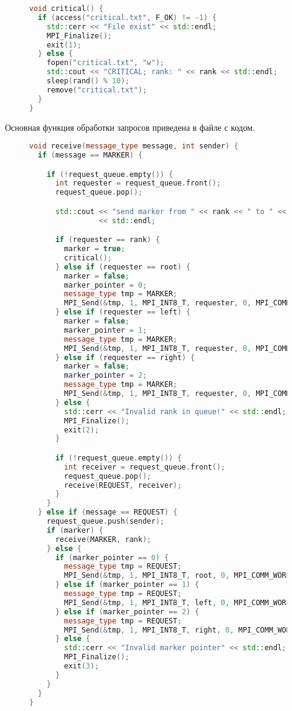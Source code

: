 \documentclass[12pt, oneside, a4paper]{article}
\begin{document}
\begin{figure}[h]
\begin{lstlisting}[language=C++]
void critical() {
  if (access("critical.txt", F_OK) != -1) {
    std::cerr << "File exist" << std::endl;
    MPI_Finalize();
    exit(1);
  } else {
    fopen("critical.txt", "w");
    std::cout << "CRITICAL; rank: " << rank << std::endl;
    sleep(rand() % 10);
    remove("critical.txt");
  }
}
\end{lstlisting}
\end{figure}

Основная функция обработки запросов приведена в файле с кодом.

\begin{figure}[h!]
\begin{lstlisting}[language=C++]
void receive(message_type message, int sender) {
  if (message == MARKER) {

    if (!request_queue.empty()) {
      int requester = request_queue.front();
      request_queue.pop();

      std::cout << "send marker from " << rank << " to " << requester
                << std::endl;

      if (requester == rank) {
        marker = true;
        critical();
      } else if (requester == root) {
        marker = false;
        marker_pointer = 0;
        message_type tmp = MARKER;
        MPI_Send(&tmp, 1, MPI_INT8_T, requester, 0, MPI_COMM_WORLD);
      } else if (requester == left) {
        marker = false;
        marker_pointer = 1;
        message_type tmp = MARKER;
        MPI_Send(&tmp, 1, MPI_INT8_T, requester, 0, MPI_COMM_WORLD);
      } else if (requester == right) {
        marker = false;
        marker_pointer = 2;
        message_type tmp = MARKER;
        MPI_Send(&tmp, 1, MPI_INT8_T, requester, 0, MPI_COMM_WORLD);
      } else {
        std::cerr << "Invalid rank in queue!" << std::endl;
        MPI_Finalize();
        exit(2);
      }

      if (!request_queue.empty()) {
        int receiver = request_queue.front();
        request_queue.pop();
        receive(REQUEST, receiver);
      }
    }
  } else if (message == REQUEST) {
    request_queue.push(sender);
    if (marker) {
      receive(MARKER, rank);
    } else {
      if (marker_pointer == 0) {
        message_type tmp = REQUEST;
        MPI_Send(&tmp, 1, MPI_INT8_T, root, 0, MPI_COMM_WORLD);
      } else if (marker_pointer == 1) {
        message_type tmp = REQUEST;
        MPI_Send(&tmp, 1, MPI_INT8_T, left, 0, MPI_COMM_WORLD);
      } else if (marker_pointer == 2) {
        message_type tmp = REQUEST;
        MPI_Send(&tmp, 1, MPI_INT8_T, right, 0, MPI_COMM_WORLD);
      } else {
        std::cerr << "Invalid marker pointer" << std::endl;
        MPI_Finalize();
        exit(3);
      }
    }
  }
}
\end{lstlisting}
\end{figure}
\end{document}
